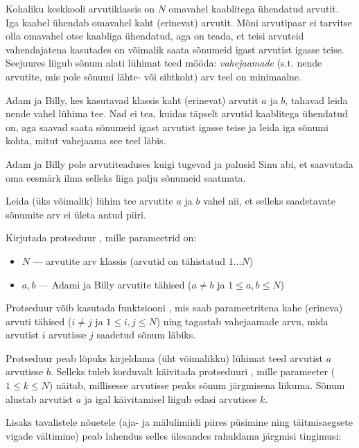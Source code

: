 \documentclass{boi2014-et}
\begin{document}
    Kohaliku keskkooli arvutiklassis on $N$ omavahel kaablitega ühendatud
    arvutit. Iga kaabel ühendab omavahel kaht (erinevat) arvutit. Mõni
    arvutipaar ei tarvitse olla omavahel otse kaabliga ühendatud, aga
    on teada, et teisi arvuteid vahendajatena kasutades on võimalik
    saata sõnumeid igast arvutist igasse teise. Seejuures liigub sõnum
    alati lühimat teed mööda: \emph{vahejaamade} (s.t. nende arvutite,
    mis pole sõnumi lähte- või sihtkoht) arv teel on minimaalne.

    Adam ja Billy, kes kasutavad klassis kaht (erinevat) arvutit $a$ ja $b$, 
    tahavad leida nende vahel lühima tee. Nad ei tea, kuidas täpselt arvutid
    kaablitega ühendatud on, aga saavad saata sõnumeid igast arvutist igasse
    teise ja leida iga sõnumi kohta, mitut vahejaama see teel läbis.

    Adam ja Billy pole arvutiteaduses kuigi tugevad ja palusid Sinu abi,
    et saavutada oma eesmärk ilma selleks liiga palju sõnumeid saatmata.

    \Task

    Leida (üks võimalik) lühim tee arvutite $a$ ja $b$ vahel nii, et selleks saadetavate
    sõnumite arv ei ületa antud piiri.

    \Implementation

    Kirjutada protseduur , mille parameetrid on:
    \begin{itemize}
        \item $N$ --- arvutite arv klassis
            (arvutid on tähistatud $1 \ldots N$)
        \item $a, b$ --- Adami ja Billy arvutite tähised
            ($a \neq b$ ja $1 \le a, b \le N$)
    \end{itemize}

    Protseduur  võib kasutada funktsiooni ,
    mis saab parameetritena kahe (erineva) arvuti tähised ($i \neq j$ ja
    $1 \le i, j \le N$) ning tagastab vahejaamade arvu, mida arvutist $i$
    arvutisse $j$ saadetud sõnum läbiks.

    Protseduur  peab lõpuks kirjeldama (üht võimalikku) lühimat
    teed arvutist $a$ arvutisse $b$. Selleks tuleb korduvalt käivitada protseduuri
    , mille parameeter ($1 \le k \le N$) näitab, millisesse
    arvutisse peaks sõnum järgmisena liikuma. Sõnum alustab arvutist $a$ ja igal
     käivitamisel liigub edasi arvutisse $k$.

    Lisaks tavalistele nõuetele (aja- ja mälulimiidi piires püsimine ning
    täitmisaegsete vigade vältimine) peab lahendus selles ülesandes rahuldama
    järgmisi tingimusi:
\end{document}
